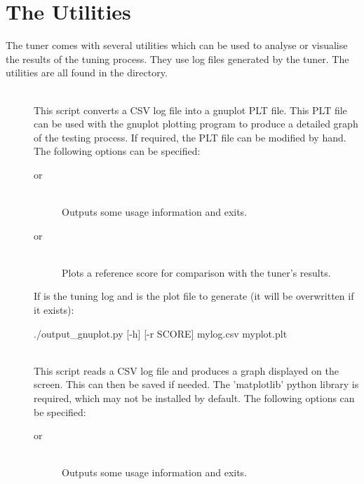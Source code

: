 \documentclass[a4paper, draft]{article}
\begin{document}
\clearpage


\section{The Utilities}
The tuner comes with several utilities which can be used to analyse or 
visualise the results of the tuning process. They use  log 
files generated by the tuner. The utilities are all found in the 
 directory.



\begin{description}

    \item[] \hfill \\
        This script converts a CSV log file into a gnuplot PLT file. This PLT 
        file can be used with the gnuplot plotting program to produce a 
        detailed graph of the testing process. If required, the PLT file can 
        be modified by hand. The following options can be specified:
        \begin{description}
            \item[ \textnormal{or} ] \hfill\\
                Outputs some usage information and exits.
            
            \item[ \textnormal{or} ] \hfill\\
                Plots a reference score for comparison with the tuner's results.
            
        \end{description}
        
        
        If  is the tuning log and  is 
        the plot file to generate (it will be overwritten if it exists):
        \begin{Code}[numbers=none]
./output_gnuplot.py [-h] [-r SCORE] mylog.csv myplot.plt
        \end{Code}


    \item[] \hfill \\
        This script reads a CSV log file and produces a graph displayed on the 
        screen. This can then be saved if needed. The 'matplotlib' python 
        library is required, which may not be installed by default. 
        The following options can be specified:
        \begin{description}
            \item[ \textnormal{or} ] \hfill\\
                Outputs some usage information and exits.
            

\end{description}
\end{description}
\end{document}
